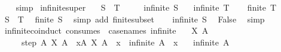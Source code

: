 \begin{isabellebody}
%
\isadelimproof
\ \ %
\endisadelimproof
%
\isatagproof
{}\isamarkupfalse%
\ simp%
\endisatagproof
{\isafoldproof}%
%
\isadelimproof
\isanewline
%
\endisadelimproof
\isanewline
{}\isamarkupfalse%
\ infinite{\isacharunderscore}{\kern0pt}super{\isacharcolon}{\kern0pt}\isanewline
\ \ \ {\isachardoublequoteopen}S\ {\isasymsubseteq}\ T{\isachardoublequoteclose}\isanewline
\ \ \ \ \ {\isachardoublequoteopen}infinite\ S{\isachardoublequoteclose}\isanewline
\ \ \ {\isachardoublequoteopen}infinite\ T{\isachardoublequoteclose}\isanewline
%
\isadelimproof
%
\endisadelimproof
%
\isatagproof
{}\isamarkupfalse%
\isanewline
\ \ \isamarkupfalse%
\ {\isachardoublequoteopen}finite\ T{\isachardoublequoteclose}\isanewline
\ \ \isamarkupfalse%
\ {\isacartoucheopen}S\ {\isasymsubseteq}\ T{\isacartoucheclose}\ \isamarkupfalse%
\ {\isachardoublequoteopen}finite\ S{\isachardoublequoteclose}\ \isamarkupfalse%
\ {\isacharparenleft}{\kern0pt}simp\ add{\isacharcolon}{\kern0pt}\ finite{\isacharunderscore}{\kern0pt}subset{\isacharparenright}{\kern0pt}\isanewline
\ \ \isamarkupfalse%
\ {\isacartoucheopen}infinite\ S{\isacartoucheclose}\ \isamarkupfalse%
\ False\ \isamarkupfalse%
\ simp\isanewline
{}\isamarkupfalse%
%
\endisatagproof
{\isafoldproof}%
%
\isadelimproof
\isanewline
%
\endisadelimproof
\isanewline
{}\isamarkupfalse%
\ infinite{\isacharunderscore}{\kern0pt}coinduct\ {\isacharbrackleft}{\kern0pt}consumes\ {}{\isacharcomma}{\kern0pt}\ case{\isacharunderscore}{\kern0pt}names\ infinite{\isacharbrackright}{\kern0pt}{\isacharcolon}{\kern0pt}\isanewline
\ \ \ {\isachardoublequoteopen}X\ A{\isachardoublequoteclose}\isanewline
\ \ \ \ \ step{\isacharcolon}{\kern0pt}\ {\isachardoublequoteopen}{\isasymAnd}A{\isachardot}{\kern0pt}\ X\ A\ {\isasymLongrightarrow}\ {\isasymexists}x{\isasymin}A{\isachardot}{\kern0pt}\ X\ {\isacharparenleft}{\kern0pt}A\ {\isacharminus}{\kern0pt}\ {\isacharbraceleft}{\kern0pt}x{\isacharbraceright}{\kern0pt}{\isacharparenright}{\kern0pt}\ {\isasymor}\ infinite\ {\isacharparenleft}{\kern0pt}A\ {\isacharminus}{\kern0pt}\ {\isacharbraceleft}{\kern0pt}x{\isacharbraceright}{\kern0pt}{\isacharparenright}{\kern0pt}{\isachardoublequoteclose}\isanewline
\ \ \ {\isachardoublequoteopen}infinite\ A{\isachardoublequoteclose}\isanewline
%
\isadelimproof
%
\endisadelimproof

\end{isabellebody}
